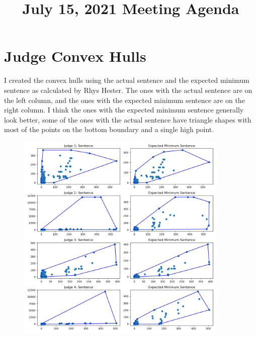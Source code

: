 \documentclass[11pt]{article}
\title{July 15, 2021 Meeting Agenda}
\begin{document}
\maketitle

\section{Judge Convex Hulls}
  I created the convex hulls using the actual sentence and the expected minimum sentence as calculated by Rhys Hester. The ones with the actual sentence are on the left column, and the ones with the expected minimum sentence are on the right column. I think the ones with the expected minimum sentence generally look better, some of the ones with the actual sentence have triangle shapes with most of the points on the bottom boundary and a single high point.

  \begin{figure}[H]
    \centering
    \includegraphics[width=0.9\textwidth]{../../../output/figures/Exploration/judge_convex_hulls_0.png}
  \end{figure}
\end{document}
